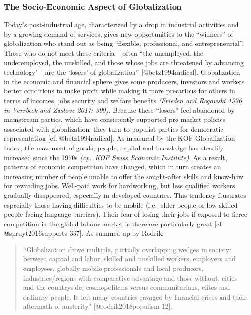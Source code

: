 \documentclass[]{article}
\begin{document}
\subsubsection{The Socio-Economic Aspect of
Globalization}\label{the-socio-economic-aspect-of-globalization}

Today's post-industrial age, characterized by a drop in industrial
activities and by a growing demand of services, gives new opportunities
to the ``winners'' of globalization who stand out as being ``flexible,
professional, and entrepreneurial''. Those who do not meet these
criteria -- often ``the unemployed, the underemployed, the unskilled,
and those whose jobs are threatened by advancing technology' -- are the
`losers' of globalization'' {[}@betz1994radical{]}. Globalization in the
economic and financial sphere gives some producers, investors and
workers better conditions to make profit while making it more precarious
for others in terms of incomes, jobs security and welfare benefits
\emph{(Frieden and Rogowski 1996 in Verrbeek and Zaslove 2017: 390)}.
Because these ``losers'' feel abandoned by mainstream parties, which
have consistently supported pro-market policies associated with
globalization, they turn to populist parties for democratic
representation {[}cf. @betz1994radical{]}. As measured by the KOP
Globalization Index, the movement of goods, people, capital and
knowledge has steadily increased since the 1970s \emph{(cp.~KOF Swiss
Economic Institute)}. As a result, patterns of economic competition have
changed, which in turn creates an increasing number of people unable to
offer the sought-after skills and know-how for rewarding jobs. Well-paid
work for hardworking, but less qualified workers gradually disappeared,
especially in developed countries. This tendency frustrates especially
those having difficulties to be mobile (i.e.~older people or low-skilled
people facing language barriers). Their fear of losing their jobs if
exposed to fierce competition in the global labour market is therefore
particularly great {[}cf. @spruyt2016supports 337{]}. As summed up by
Rodrik:

\begin{quote}
``Globalization drove multiple, partially overlapping wedges in society:
between capital and labor, skilled and unskilled workers, employers and
employees, globally mobile professionals and local producers,
industries/regions with comparative advantage and those without, cities
and the countryside, cosmopolitans versus communitarians, elites and
ordinary people. It left many countries ravaged by financial crises and
their aftermath of austerity'' {[}@rodrik2018populism 12{]}.
\end{quote}
\end{document}
